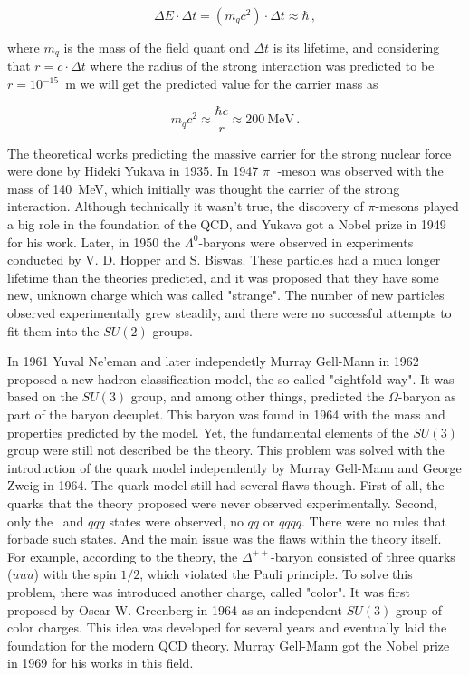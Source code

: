 \begin{equation}
\Delta E \cdot \Delta t = (m_{q}c^{2}) \cdot \Delta t \approx \hbar \,,
\end{equation}

where $m_{q}$ is the mass of the field quant ond $\Delta t$ is its lifetime, and considering that $r = c \cdot \Delta t$ where the radius of the strong interaction was predicted to be $r = 10^{-15}$~m we will get the predicted value for the carrier mass as

\begin{equation}
m_{q}c^{2} \approx \frac{\hbar c}{r} \approx 200 \: \mbox{MeV}\,.
\end{equation}

The theoretical works predicting the massive carrier for the strong nuclear force were done by Hideki Yukava in 1935. In 1947 $\pi^{+}$-meson was observed with the mass of 140~MeV, which initially was thought the carrier of the strong interaction. Although technically it wasn't true, the discovery of $\pi$-mesons played a big role in the foundation of the QCD, and Yukava got a Nobel prize in 1949 for his work. Later, in 1950 the $\Lambda^{0}$-baryons were observed in experiments conducted by V. D. Hopper and S. Biswas. These particles had a much longer lifetime than the theories predicted, and it was proposed that they have some new, unknown charge which was called "strange". The number of new particles observed experimentally grew steadily, and there were no successful attempts to fit them into the $SU(2)$ groups.

In 1961 Yuval Ne'eman and later independetly Murray Gell-Mann in 1962 proposed a new hadron classification model, the so-called "eightfold way". It was based on the $SU(3)$ group, and among other things, predicted the $\Omega$-baryon as part of the baryon decuplet. This baryon was found in 1964 with the mass and properties predicted by the model. Yet, the fundamental elements of the $SU(3)$ group were still not described be the theory. This problem was solved with the introduction of the quark model independently by Murray Gell-Mann and George Zweig in 1964. The quark model still had several flaws though. First of all, the quarks that the theory proposed were never observed experimentally. Second, only the \ and $qqq$ states were observed, no $qq$ or $qqqq$. There were no rules that forbade such states. And the main issue was the flaws within the theory itself. For example, according to the theory, the $\Delta^{++}$-baryon consisted of three quarks ($uuu$) with the spin $1/2$, which violated the Pauli principle. To solve this problem, there was introduced another charge, called "color". It was first proposed by Oscar W. Greenberg in 1964 as an independent $SU(3)$ group of color charges. This idea was developed for several years and eventually laid the foundation for the modern QCD theory. Murray Gell-Mann got the Nobel prize in 1969 for his works in this field.

